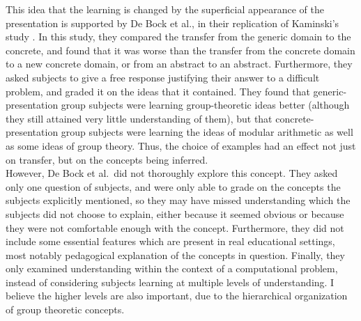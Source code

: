 \documentclass[11pt]{article}
\begin{document}
This idea that the learning is changed by the superficial appearance of the presentation is supported by De Bock et al., in their replication of Kaminski's study \cite{DeBock2011}. In this study, they compared the transfer from the generic domain to the concrete, and found that it was worse than the transfer from the concrete domain to a new concrete domain, or from an abstract to an abstract. Furthermore, they asked subjects to give a free response justifying their answer to a difficult problem, and graded it on the ideas that it contained. They found that generic-presentation group subjects were learning group-theoretic ideas better (although they still attained very little understanding of them), but that concrete-presentation group subjects were learning the ideas of modular arithmetic as well as some ideas of group theory. Thus, the choice of examples had an effect not just on transfer, but on the concepts being inferred. \\[11pt]
However, De Bock et al.\ did not thoroughly explore this concept. They asked only one question of subjects, and were only able to grade on the concepts the subjects explicitly mentioned, so they may have missed understanding which the subjects did not choose to explain, either because it seemed obvious or because they were not comfortable enough with the concept. Furthermore, they did not include some essential features which are present in real educational settings, most notably pedagogical explanation of the concepts in question. Finally, they only examined understanding within the context of a computational problem, instead of considering subjects learning at multiple levels of understanding. I believe the higher levels are also important, due to the hierarchical organization of group theoretic concepts. \\[11pt]
\end{document}
